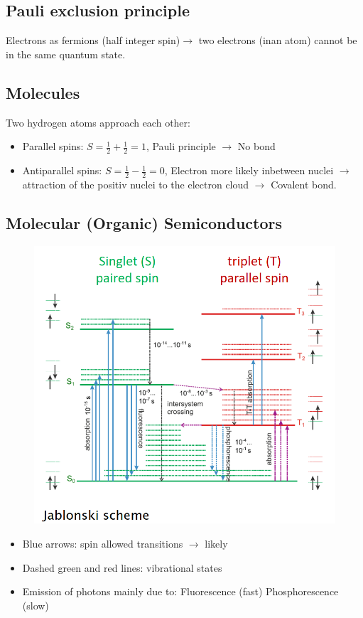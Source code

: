 \subsection{Pauli exclusion principle}
Electrons as fermions (half integer spin)\(\rightarrow\) two electrons (inan atom) cannot be in the same quantum state.

\subsection{Molecules}
Two hydrogen atoms approach each other:
\begin{itemize}
    \item Parallel spins: \(S = \frac{1}{2} + \frac{1}{2} = 1\), Pauli principle \(\rightarrow\) No bond
    \item Antiparallel spins: \(S = \frac{1}{2} - \frac{1}{2} = 0\), Electron more likely inbetween nuclei \(\rightarrow\) attraction of the positiv nuclei to the electron cloud \(\rightarrow\) Covalent bond.
\end{itemize}
\subsection{Molecular (Organic) Semiconductors}
\begin{figure}[h]
    \centering
    \includegraphics[width=\columnwidth]{images/jablonski.png}
    \label{fig:jablonski}
\end{figure}
\begin{itemize}
    \item Blue arrows: spin allowed transitions \(\rightarrow\) likely
    \item Dashed green and red lines: vibrational states
    \item Emission of photons mainly due to:
    \subitem Fluorescence (fast)
    \subitem Phosphorescence (slow)
\end{itemize}

